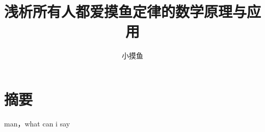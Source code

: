 \documentclass[winfonts, thesis]{njuthesis}
\title{浅析所有人都爱摸鱼定律的数学原理与应用}
\author{小摸鱼}
\begin{document}
\fontsize{11pt}{10pt}\selectfont
\maketitle




%
%
%
%






\section*{摘要}
man，what can i say
\end{document}
